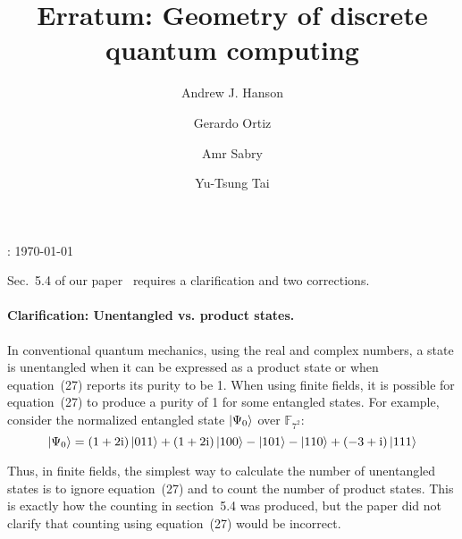 \documentclass{iopart}
\newcommand{\ff}[1]{\mathbb{F}_{#1}}
\begin{document}
\title{Erratum: Geometry of discrete quantum computing}


\author{Andrew J. Hanson}


\address{School of Informatics and Computing, Indiana University, Bloomington,
IN 47405, U.S.A}


\author{Gerardo Ortiz}


\address{Department of Physics, Indiana University, Bloomington, IN 47405,
U.S.A}


\author{Amr Sabry}


\address{School of Informatics and Computing, Indiana University, Bloomington,
IN 47405, U.S.A}


\author{Yu-Tsung Tai}


\address{Department of Mathematics, Indiana University, Bloomington, IN 47405,
U.S.A}


\address{School of Informatics and Computing, Indiana University, Bloomington,
IN 47405, U.S.A}


: {\today}

\maketitle

\noindent Sec.~5.4 of our paper~\cite{geometry} requires a clarification
and two corrections.


\paragraph*{Clarification: Unentangled vs. product states.}

In conventional quantum mechanics, using the real and complex numbers,
a state is unentangled when it can be expressed as a product state
or when equation~(27) reports its purity to be 1. When using finite
fields, it is possible for equation~(27) to produce a purity of 1
for some entangled states. For example, consider the normalized entangled
state $\ket{\Psi_{0}}$ over $\ff{7^{2}}$: 
\[
\ket{\Psi_{0}}=\left(1+2\mathrm{i}\right)\ket{011}+\left(1+2\mathrm{i}\right)\ket{100}-\ket{101}-\ket{110}+\left(-3+\mathrm{i}\right)\ket{111}
\]


Thus, in finite fields, the simplest way to calculate the number of
unentangled states is to ignore equation~(27) and to count the number
of product states. This is exactly how the counting in section~5.4
was produced, but the paper did not clarify that counting using equation~(27)
would be incorrect.
\end{document}

